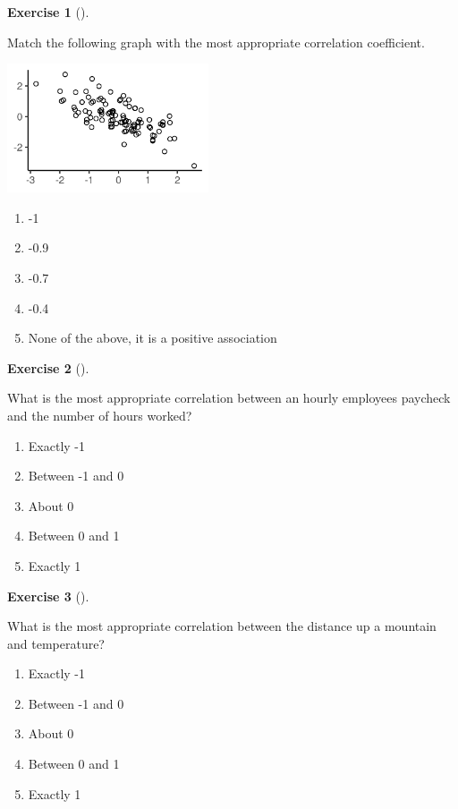 \documentclass[
  letterpaper,
  DIV=11,
  numbers=noendperiod]{scrreprt}
\providecommand{\tightlist}{%
  \setlength{\itemsep}{0pt}\setlength{\parskip}{0pt}}\usepackage{longtable,booktabs,array}
\theoremstyle{definition}
\newtheorem{exercise}{Exercise}[chapter]
\theoremstyle{remark}
\begin{document}
\leavevmode{}%
\begin{exercise}[]\label{exr-ch05-c01}

Match the following graph with the most appropriate correlation
coefficient.

\includegraphics[width=\textwidth,height=1.5in]{images/cor_-0.7.png}

\begin{enumerate}
\def\labelenumi{\alph{enumi})}
\tightlist
\item
  -1
\item
  -0.9
\item
  -0.7
\item
  -0.4
\item
  None of the above, it is a positive association
\end{enumerate}

\end{exercise}

\leavevmode{}%
\begin{exercise}[]\label{exr-ch05-c02}

What is the most appropriate correlation between an hourly employees
paycheck and the number of hours worked?

\begin{enumerate}
\def\labelenumi{\alph{enumi})}
\tightlist
\item
  Exactly -1
\item
  Between -1 and 0
\item
  About 0
\item
  Between 0 and 1
\item
  Exactly 1
\end{enumerate}

\end{exercise}

\leavevmode{}%
\begin{exercise}[]\label{exr-ch05-c03}

What is the most appropriate correlation between the distance up a
mountain and temperature?

\begin{enumerate}
\def\labelenumi{\alph{enumi})}
\tightlist
\item
  Exactly -1
\item
  Between -1 and 0
\item
  About 0
\item
  Between 0 and 1
\item
  Exactly 1
\end{enumerate}

\end{exercise}
\end{document}

